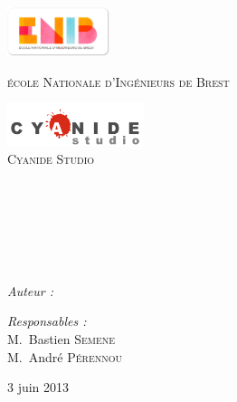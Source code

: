 
\begin{titlepage}

\begin{center}

\begin{minipage}[t]{0.48\textwidth}
  \begin{flushleft}
    \includegraphics [width=30mm]{images/logo-enib.jpg} \\[0.5cm]
    \begin{spacing}{1.5}
      \textsc{\LARGE école Nationale d'Ingénieurs de Brest}
    \end{spacing}
  \end{flushleft}
\end{minipage}
\begin{minipage}[t]{0.48\textwidth}
  \begin{flushright}
    \includegraphics [width=40mm]{images/logo-cyanide.png} \\[0.5cm]
    \textsc{\LARGE Cyanide Studio}
  \end{flushright}
\end{minipage} \\[1.5cm]

\textsc{\Large \reportsubject}\\[0.5cm]
\HRule \\[0.4cm]
{\huge \bfseries \reporttitle}\\[0.4cm]
\HRule \\[1.5cm]

\begin{minipage}[t]{0.3\textwidth}
  \begin{flushleft} \large
    \emph{Auteur :}\\
    \reportauthor
  \end{flushleft}
\end{minipage}
\begin{minipage}[t]{0.6\textwidth}
  \begin{flushright} \large
    \emph{Responsables :} \\
    M.~Bastien \textsc{Semene} \\
    M.~André \textsc{Pérennou}
  \end{flushright}
\end{minipage}

\vfill

{\large 3 juin 2013}

\end{center}

\end{titlepage}
